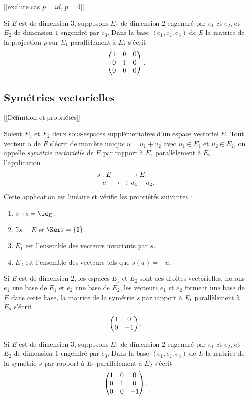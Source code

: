 \documentclass[class=report,crop=false]{standalone}
\begin{document}
[[exclure cas $p=id$, $p=0$]]

Si $E$ est de dimension $3$, supposons $E_1$ de dimension $2$ engendré par $e_1$ et $e_2$, et $E_2$ de dimension $1$ engendré par $e_3$. Dans la base $(e_1,e_2,e_3)$ de $E$ la matrice de la projection $p$ sur $E_1$ parallèlement à $E_2$ s'écrit
$$\left(\begin{matrix}1&0&0\cr0&1&0\cr0&0&0\end{matrix}\right).$$


\subsection{Symétries vectorielles}

[[Définition et propriétés]]

\begin{proposition}
Soient $E_1$ et $E_2$ deux sous-espaces supplémentaires d'un espace vectoriel $E$. Tout vecteur $u$ de $E$ s'écrit de manière unique $u=u_1+u_2$ avec $u_1\in E_1$ et $u_2\in E_2$, on appelle \emph{symétrie vectorielle}  de $E$ par rapport à $E_1$ parallèlement à $E_2$ l'application
$$\begin{array}{cc}s:E&\longrightarrow E\cr u&\longmapsto u_1-u_2.\end{array}$$
Cette application est linéaire et vérifie les propriétés suivantes :
\begin{enumerate}
  \item $s\circ s=\id_E$.
  \item $\Im s =E$ et $\Ker s=\{0\}$.
  \item $E_1$ est l'ensemble des vecteurs invariants par $s$.
  \item $E_2$ est l'ensemble des vecteurs tels que $s(u)=-u$.  
\end{enumerate}
\end{proposition}

Si $E$ est de dimension $2$, les espaces $E_1$ et $E_2$ sont des droites vectorielles, 
notons $e_1$ une base de $E_1$ et $e_2$ une base de $E_2$, 
les vecteurs $e_1$ et $e_2$ forment une base de $E$ dans cette base, 
la matrice de la symétrie $s$ par rapport à $E_1$ parallèlement à $E_2$ s'écrit
$$\left(\begin{matrix}1&0\cr0&-1\end{matrix}\right).$$

Si $E$ est de dimension $3$, supposons $E_1$ de dimension $2$ engendré 
par $e_1$ et $e_2$, et $E_2$ de dimension $1$ engendré par $e_3$. 
Dans la base $(e_1,e_2,e_3)$ de $E$ la matrice de la symétrie $s$ par 
rapport à $E_1$ parallèlement à $E_2$ s'écrit
$$\left(\begin{matrix}1&0&0\cr0&1&0\cr0&0&-1\end{matrix}\right).$$
\end{document}
